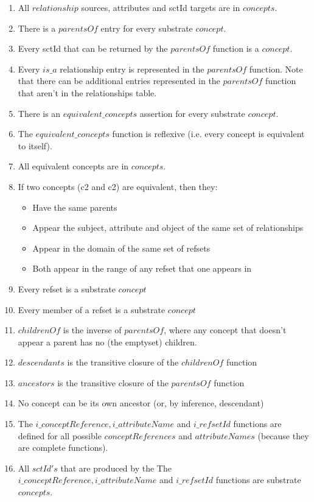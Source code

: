 \documentclass{article}
\begin{document}
\begin{enumerate}
\item All $relationship$ sources, attributes and sctId targets are in $concepts$.
\item There is a $parentsOf$ entry for every substrate $concept$.
\item Every sctId that can be returned by the $parentsOf$ function is a $concept$.
\item Every $is\_a$ relationship entry is represented in the $parentsOf$ function. Note that there can be additional entries represented in the $parentsOf$ function that aren't in the relationships table.
\item There is an $equivalent\_concepts$ assertion for every substrate $concept$.
\item The $equivalent\_concepts$ function is reflexive (i.e. every concept is equivalent to itself).
\item All equivalent concepts are in $concepts$.
\item If two concepts (c2 and c2) are equivalent, then they:
\begin{itemize}[noitemsep,nolistsep]
\item Have the same parents
\item Appear the subject, attribute and object of the same set of relationships
\item Appear in the domain of the same set of refsets
\item Both appear in the range of any refset that one appears in
\end{itemize}
\item Every refset is a substrate $concept$
\item Every member of a refset is a substrate $concept$
\item $childrenOf$ is the inverse of $parentsOf$, where any concept that doesn't appear a parent has no (the emptyset) children.
\item $descendants$ is the transitive closure of the $childrenOf$ function
\item $ancestors$ is the transitive closure of the $parentsOf$ function
\item No concept can be its own ancestor (or, by inference, descendant)
\item The $i\_conceptReference, i\_attributeName$ and $i\_refsetId$ functions are defined for all possible $conceptReferences$ and $attributeNames$ (because they are complete functions).
\item All $sctId's$ that are produced by the The $i\_conceptReference, i\_attributeName$ and $i\_refsetId$ functions are substrate $concepts$.
\end{enumerate}
\end{document}
